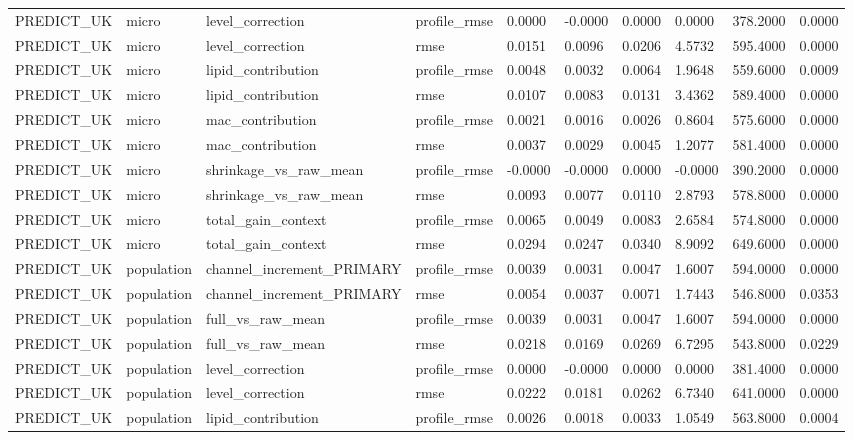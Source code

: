 {\begin{longtable}{llllllllll}
PREDICT\_UK & micro & level\_correction & profile\_rmse & 0.0000 & -0.0000 & 0.0000 & 0.0000 & 378.2000 & 0.0000 \\
PREDICT\_UK & micro & level\_correction & rmse & 0.0151 & 0.0096 & 0.0206 & 4.5732 & 595.4000 & 0.0000 \\
PREDICT\_UK & micro & lipid\_contribution & profile\_rmse & 0.0048 & 0.0032 & 0.0064 & 1.9648 & 559.6000 & 0.0009 \\
PREDICT\_UK & micro & lipid\_contribution & rmse & 0.0107 & 0.0083 & 0.0131 & 3.4362 & 589.4000 & 0.0000 \\
PREDICT\_UK & micro & mac\_contribution & profile\_rmse & 0.0021 & 0.0016 & 0.0026 & 0.8604 & 575.6000 & 0.0000 \\
PREDICT\_UK & micro & mac\_contribution & rmse & 0.0037 & 0.0029 & 0.0045 & 1.2077 & 581.4000 & 0.0000 \\
PREDICT\_UK & micro & shrinkage\_vs\_raw\_mean & profile\_rmse & -0.0000 & -0.0000 & 0.0000 & -0.0000 & 390.2000 & 0.0000 \\
PREDICT\_UK & micro & shrinkage\_vs\_raw\_mean & rmse & 0.0093 & 0.0077 & 0.0110 & 2.8793 & 578.8000 & 0.0000 \\
PREDICT\_UK & micro & total\_gain\_context & profile\_rmse & 0.0065 & 0.0049 & 0.0083 & 2.6584 & 574.8000 & 0.0000 \\
PREDICT\_UK & micro & total\_gain\_context & rmse & 0.0294 & 0.0247 & 0.0340 & 8.9092 & 649.6000 & 0.0000 \\
PREDICT\_UK & population & channel\_increment\_PRIMARY & profile\_rmse & 0.0039 & 0.0031 & 0.0047 & 1.6007 & 594.0000 & 0.0000 \\
PREDICT\_UK & population & channel\_increment\_PRIMARY & rmse & 0.0054 & 0.0037 & 0.0071 & 1.7443 & 546.8000 & 0.0353 \\
PREDICT\_UK & population & full\_vs\_raw\_mean & profile\_rmse & 0.0039 & 0.0031 & 0.0047 & 1.6007 & 594.0000 & 0.0000 \\
PREDICT\_UK & population & full\_vs\_raw\_mean & rmse & 0.0218 & 0.0169 & 0.0269 & 6.7295 & 543.8000 & 0.0229 \\
PREDICT\_UK & population & level\_correction & profile\_rmse & 0.0000 & -0.0000 & 0.0000 & 0.0000 & 381.4000 & 0.0000 \\
PREDICT\_UK & population & level\_correction & rmse & 0.0222 & 0.0181 & 0.0262 & 6.7340 & 641.0000 & 0.0000 \\
PREDICT\_UK & population & lipid\_contribution & profile\_rmse & 0.0026 & 0.0018 & 0.0033 & 1.0549 & 563.8000 & 0.0004 \\

\end{longtable}}
